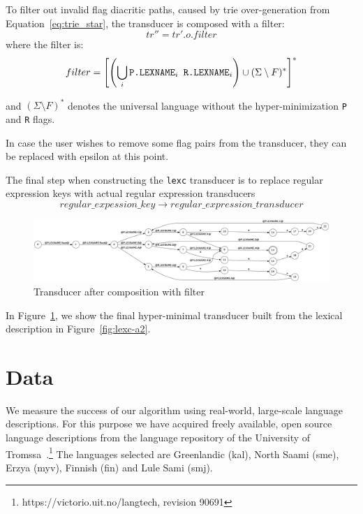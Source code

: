 \documentclass[11pt]{article}
\begin{document}
To filter out invalid flag diacritic paths, caused by trie over-generation from Equation~\ref{eq:trie_star}, the transducer is composed with a filter:
\begin{equation}\label{eq:composition}
tr'' = tr' .o. filter
\end{equation}
where the filter is:
\begin{equation}\label{eq:filter}
filter = \left[ \left(\bigcup_{i} \verb+P.LEXNAME+_i \verb+ R.LEXNAME+_i \right) \cup (\Sigma \setminus F) ^*\right]^* 
\end{equation}

and $(\Sigma \setminus F)^*$ denotes the universal language without the hyper-minimization \verb+P+ and \verb+R+ flags.


In case the user wishes to remove some flag pairs from the transducer, they can be replaced with epsilon at this point.


The final step when constructing the \texttt{lexc} transducer is to replace regular expression keys with actual regular expression transducers
\begin{equation}\label{eq:regex}
regular\_expession\_key \rightarrow regular\_expression\_transducer
\end{equation}

\begin{figure}[h]
    \includegraphics[width=\textwidth]{after_comp.png}
     \caption{Transducer after composition with filter
     \label{fig:after}}
\end{figure}

In Figure~\ref{fig:after}, we show the final hyper-minimal transducer built from the lexical description in Figure~\ref{fig:lexc-a2}. 



\section{Data}
\label{sec:data}

We measure the success of our algorithm using real-world, large-scale
language descriptions. For this purpose we have acquired freely
available, open source language descriptions from the language repository of the University of 
Tromssa~\cite{moshagen2013building}.\footnote{https://victorio.uit.no/langtech, revision 90691} The
languages selected are Greenlandic (kal), North Saami (sme), Erzya
(myv), Finnish (fin) and Lule Sami (smj).
\end{document}
